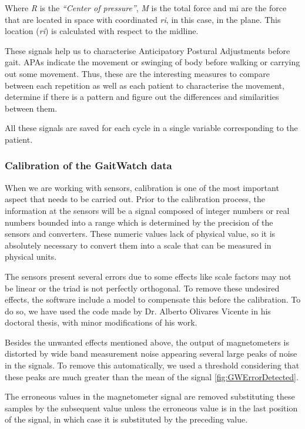 Where \textit{R} is the \textit{“Center of pressure”\textit{}}, \textit{M\textit{}} is the total force and mi are the force that are located in space with coordinated \textit{ri\textit{}}, in this case, in the plane. This location (\textit{ri}) is calculated with respect to the midline.

These signals help us to characterise Anticipatory Postural Adjustments  before gait.  APAs indicate the movement or swinging of body before walking or carrying out some movement. Thus, these are the interesting  measures to compare between each repetition as well as each patient to characterise the movement, determine if there is a pattern and figure out the differences and similarities between them.

All these signals are saved for each cycle in a single variable corresponding to the patient.


\subsubsection{Calibration of the GaitWatch data}
When we are working with sensors, calibration is one of the most important aspect that needs to be carried out. Prior to the calibration process, the information at the sensors  will be a signal composed of integer numbers  or real numbers bounded into a range which is determined by the precision of the sensors and converters. These numeric values lack of physical value, so it is absolutely necessary to convert them into a scale that can be measured in physical units.

The sensors present several errors due to some effects like scale factors may not be linear or the triad is not perfectly orthogonal. To remove these undesired effects, the software include a model to compensate this before the calibration. 
To do so, we have used the code made by Dr. Alberto Olivares Vicente in his doctoral thesis\cite{A.Olivares2013}, with minor modifications of his work.

Besides the unwanted effects mentioned above, the output of magnetometers is distorted by wide band measurement noise appearing several large peaks of noise in the signals. To remove this automatically, we used a threshold considering that these peaks are much greater than the mean of the signal \ref{fig:GWErrorDetected}.

The erroneous values in the magnetometer signal are removed substituting these samples by the subsequent value unless the erroneous value is in the last position of the signal, in which case it is substituted by the preceding value.


